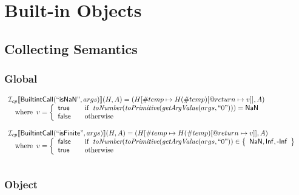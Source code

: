 
\chapter{Built-in Objects}
\section{Collecting Semantics}

\subsection{Global}

\[
\begin{array}{l}

\I _{cp}\lbr \SF{BuiltintCall}(``\SF{isNaN}",args)\rbr(H,A)
  = (H[\#temp \mapsto H(\#temp)[@return \mapsto v]], A)\\
 \quad\wherec{
  v =
  \left\{
    \begin{array}{l@{\quad\quad}l}
      \SF{true} & \ifc{\hf{toNumber}(\hf{toPrimitive}(\hf{getArgValue}(args, ``0")))=\SF{NaN}} \\
      \SF{false} & \owc \\
    \end{array}
  \right.}
\\\\

\I _{cp}\lbr \SF{BuiltintCall}(``\SF{isFinite}",args)\rbr(H,A)\hf{} 
 = (H[\#temp \mapsto H(\#temp)[@return \mapsto v]], A)\\
 \quad\wherec{
  v =
  \left\{
    \begin{array}{l@{\quad\quad}l}
      \SF{false} & \ifc{\hf{toNumber}(\hf{toPrimitive}(\hf{getArgValue}(args, ``0")) \in \set{\SF{NaN}, \SF{Inf}, \SF{-Inf}}}\\
      \SF{true} & \owc\\
    \end{array}
  \right.}
\\\\
\end{array}
\]


\subsection{Object}


